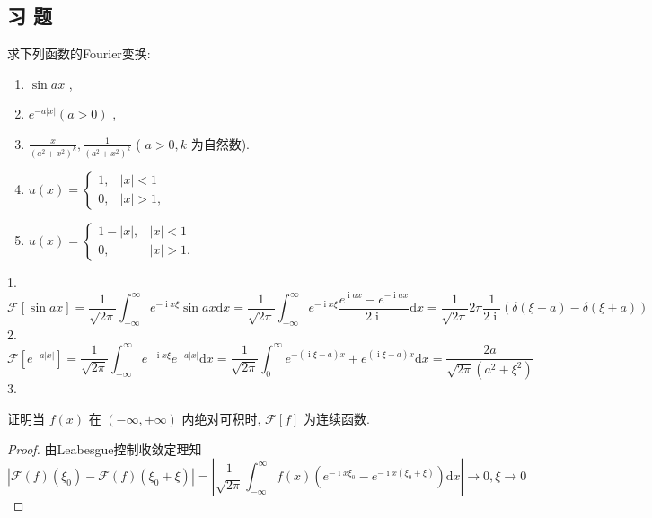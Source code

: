 \documentclass[lang=cn,newtx,10pt,scheme=chinese,thmcnt=chapter]{elegantbook}
\newcommand{\dif}{\mathrm{d}}
\newcommand{\ci}{\operatorname{i}}
\begin{document}
\subsection{习 题}
\begin{problemset}
  \item 求下列函数的Fourier变换:\begin{enumerate}
  \item \(\sin {ax}\) ,
  \item  \({e}^{-a\left| x\right| }\left( {a > 0}\right)\) ,
  \item \(\frac{x}{{\left( {a}^{2} + {x}^{2}\right) }^{k}},\frac{1}{{\left( {a}^{2} + {x}^{2}\right) }^{k}}\) ( \(a > 0,k\) 为自然数).
  \item \(u\left( x\right)  = \left\{  \begin{matrix} 1, & \left| x\right|  < 1 \\  0, & \left| x\right|  > 1, \end{matrix}\right.\)
  \item  \(u\left( x\right)  = \left\{  \begin{array}{ll} 1 - \left| x\right| , & \left| x\right|  < 1 \\  0, & \left| x\right|  > 1. \end{array}\right.\)
\end{enumerate}
\begin{solution}
    1. \[
    \mathcal{F}[\sin ax]=\frac{1}{\sqrt{2\pi}}\int_{-\infty}^\infty e^{-\ci x\xi }\sin ax\dif x=\frac{1}{\sqrt{2\pi}}\int_{-\infty}^\infty  e^{-\ci x\xi }\frac{e^{\operatorname{i}ax}-e^{-\operatorname{i}ax}}{2\ci}\dif x=\frac{1}{\sqrt{2\pi}}2\pi \frac{1}{2\ci}(\delta(\xi-a)-\delta(\xi+a))
    \]
    2.
    \[
    \mathcal{F}[{e}^{-a\left| x\right| }]=\frac{1}{\sqrt{2\pi}}\int_{-\infty}^\infty e^{-\ci x\xi }{e}^{-a\left| x\right| }\dif x=\frac{1}{\sqrt{2\pi}}\int_{0}^\infty  e^{-(\ci \xi+a)x }+e^{(\ci \xi-a)x }\dif x=\frac{2a}{\sqrt{2\pi}(a^2+\xi^2)}
    \]
    3.


\end{solution}
\item 证明当 \(f\left( x\right)\) 在 \(\left( {-\infty , + \infty }\right)\) 内绝对可积时, \(\mathcal{F}\left\lbrack  f\right\rbrack\) 为连续函数.
\begin{proof}
    由Leabesgue控制收敛定理知
    \[\left|\mathcal{F}(f)(\xi_0)-\mathcal{F}(f)(\xi_0+\xi)\right|=\left|\frac{1}{\sqrt{2\pi}}\int_{-\infty}^\infty f(x)\left( e^{-\ci x\xi_0}- e^{-\ci x(\xi_0+\xi)}\right)\dif x \right|\to 0,\xi\to 0\]
    

\end{proof}
\end{problemset}
\end{document}
